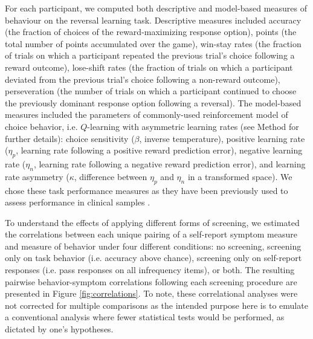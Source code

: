 \documentclass[a4paper,notitlepage,12pt]{article}
\begin{document}
For each participant, we computed both descriptive and model-based measures of behaviour on the reversal learning task. Descriptive measures included accuracy (the fraction of choices of the reward-maximizing response option), points (the total number of points accumulated over the game), win-stay rates (the fraction of trials on which a participant repeated the previous trial's choice following a reward outcome), lose-shift rates (the fraction of trials on which a participant deviated from the previous trial's choice following a non-reward outcome), perseveration (the number of trials on which a participant continued to choose the previously dominant response option following a reversal). The model-based measures included the parameters of commonly-used reinforcement model of choice behavior, i.e. $Q$-learning with asymmetric learning rates (see Method for further details): choice sensitivity ($\beta$,  inverse temperature), positive learning rate ($\eta_p$, learning rate following a positive reward prediction error), negative learning rate ($\eta_n$, learning rate following a negative reward prediction error), and learning rate asymmetry ($\kappa$, difference between $\eta_p$ and $\eta_n$ in a transformed space). We chose these task performance measures as they have been previously used to assess performance in clinical samples \cite{huang2017computational, brolsma2020challenging, mukherjee_reward_2020, ritschel2017neural}. 

To understand the effects of applying different forms of screening, we estimated the correlations between each unique pairing of a self-report symptom measure and measure of behavior under four different conditions: no screening, screening only on task behavior (i.e. accuracy above chance), screening only on self-report responses (i.e. pass responses on all infrequency items), or both. The resulting pairwise behavior-symptom correlations following each screening procedure are presented in Figure \ref{fig:correlations}. To note, these correlational analyses were not corrected for multiple comparisons as the intended purpose here is to emulate a conventional analysis where fewer statistical tests would be performed, as dictated by one's hypotheses.
\end{document}
